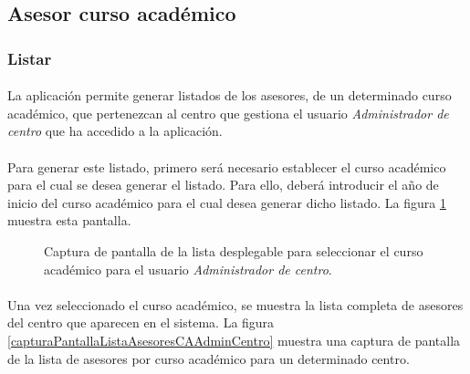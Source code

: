 \subsection{Asesor curso académico}

  \subsubsection{Listar}

  \paragraph{}La aplicación permite generar listados de los asesores, de un
  determinado curso académico, que pertenezcan al centro que gestiona el usuario
  \textit{Administrador de centro} que ha accedido a la aplicación.

  \paragraph{}Para generar este listado, primero será necesario establecer el
  curso académico para el cual se desea generar el listado. Para ello, deberá
  introducir el año de inicio del curso académico para el cual desea generar
  dicho listado. La figura \ref{capturaPantallaSelectCAAdminCentro} muestra esta
  pantalla.

  \begin{figure}[!ht]
    \begin{center}
      \caption{Captura de pantalla de la lista desplegable para seleccionar el curso académico para el usuario \textit{Administrador de centro}.}
      \label{capturaPantallaSelectCAAdminCentro}
    \end{center}
  \end{figure}

  \paragraph{}Una vez seleccionado el curso académico, se muestra la lista
  completa de asesores del centro que aparecen en el sistema. La figura
  \ref{capturaPantallaListaAsesoresCAAdminCentro} muestra
  una captura de pantalla de la lista de asesores por curso académico para un
  determinado centro.

